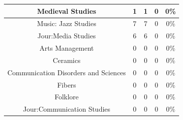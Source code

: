 \documentclass[10pt]{article}
\begin{document}
\begin{longtable}[c]{|ccccc|}
	\multicolumn{1}{|c|}{Medieval Studies}                           & \multicolumn{1}{c|}{1}                               & \multicolumn{1}{c|}{1}                                   & \multicolumn{1}{c|}{0}                  & 0\%                   \\ \hline
	\multicolumn{1}{|c|}{Music: Jazz Studies}                        & \multicolumn{1}{c|}{7}                               & \multicolumn{1}{c|}{7}                                   & \multicolumn{1}{c|}{0}                  & 0\%                   \\ \hline
	\multicolumn{1}{|c|}{Jour:Media Studies}                         & \multicolumn{1}{c|}{6}                               & \multicolumn{1}{c|}{6}                                   & \multicolumn{1}{c|}{0}                  & 0\%                   \\ \hline
	\multicolumn{1}{|c|}{Arts Management}                            & \multicolumn{1}{c|}{0}                               & \multicolumn{1}{c|}{0}                                   & \multicolumn{1}{c|}{0}                  & 0\%                   \\ \hline
	\multicolumn{1}{|c|}{Ceramics}                                   & \multicolumn{1}{c|}{0}                               & \multicolumn{1}{c|}{0}                                   & \multicolumn{1}{c|}{0}                  & 0\%                   \\ \hline
	\multicolumn{1}{|c|}{Communication Disorders and Sciences}       & \multicolumn{1}{c|}{0}                               & \multicolumn{1}{c|}{0}                                   & \multicolumn{1}{c|}{0}                  & 0\%                   \\ \hline
	\multicolumn{1}{|c|}{Fibers}                                     & \multicolumn{1}{c|}{0}                               & \multicolumn{1}{c|}{0}                                   & \multicolumn{1}{c|}{0}                  & 0\%                   \\ \hline
	\multicolumn{1}{|c|}{Folklore}                                   & \multicolumn{1}{c|}{0}                               & \multicolumn{1}{c|}{0}                                   & \multicolumn{1}{c|}{0}                  & 0\%                   \\ \hline
	\multicolumn{1}{|c|}{Jour:Communication Studies}                 & \multicolumn{1}{c|}{0}                               & \multicolumn{1}{c|}{0}                                   & \multicolumn{1}{c|}{0}                  & 0\%                   \\ \hline

\end{longtable}
\end{document}
